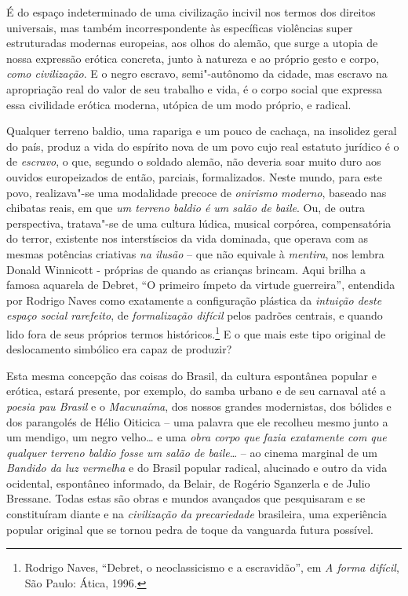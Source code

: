 É do espaço indeterminado de uma civilização incivil nos termos dos
direitos universais, mas também incorrespondente às específicas
violências super estruturadas modernas europeias, aos olhos do alemão,
que surge a utopia de nossa expressão erótica concreta, junto à natureza
e ao próprio gesto e corpo, \emph{como civilização}. E o negro escravo,
semi"-autônomo da cidade, mas escravo na apropriação real do valor de seu
trabalho e vida, é o corpo social que expressa essa civilidade erótica
moderna, utópica de um modo próprio, e radical.

Qualquer terreno baldio, uma rapariga e um pouco de cachaça, na
insolidez geral do país, produz a vida do espírito nova de um povo cujo
real estatuto jurídico é o de \emph{escravo}, o que, segundo o soldado
alemão, não deveria soar muito duro aos ouvidos europeizados de então,
parciais, formalizados. Neste mundo, para este povo, realizava"-se uma
modalidade precoce de \emph{onirismo} \emph{moderno}, baseado nas
chibatas reais, em que \emph{um terreno baldio é um salão de baile}. Ou,
de outra perspectiva, tratava"-se de uma cultura lúdica, musical
corpórea, compensatória do terror, existente nos interstíscios da vida
dominada, que operava com as mesmas potências criativas \emph{na ilusão}
-- que não equivale à \emph{mentira}, nos lembra Donald Winnicott -
próprias de quando as crianças brincam. Aqui brilha a famosa aquarela de
Debret, ``O primeiro ímpeto da virtude guerreira'', entendida por
Rodrigo Naves como exatamente a configuração plástica da \emph{intuição
deste espaço social rarefeito}, de \emph{formalização difícil} pelos
padrões centrais, e quando lido fora de seus próprios termos
históricos.\footnote{Rodrigo Naves, ``Debret, o neoclassicismo e a
  escravidão'', em \emph{A forma difícil}, São Paulo: Ática, 1996.} E o
que mais este tipo original de deslocamento simbólico era capaz de
produzir?

Esta mesma concepção das coisas do Brasil, da cultura espontânea popular
e erótica, estará presente, por exemplo, do samba urbano e de seu
carnaval até a \emph{poesia pau Brasil} e o \emph{Macunaíma}, dos nossos
grandes modernistas, dos bólides e dos parangolés de Hélio Oiticica --
uma palavra que ele recolheu mesmo junto a um mendigo, um negro velho\ldots{}
e uma \emph{obra corpo} \emph{que fazia exatamente com que qualquer
terreno baldio fosse um salão de baile}\ldots{} -- ao cinema marginal de um
\emph{Bandido da luz vermelha} e do Brasil popular radical, alucinado e
outro da vida ocidental, espontâneo informado, da Belair, de Rogério
Sganzerla e de Julio Bressane. Todas estas são obras e mundos avançados
que pesquisaram e se constituíram diante e na \emph{civilização da
precariedade} brasileira, uma experiência popular original que se tornou
pedra de toque da vanguarda futura possível.

